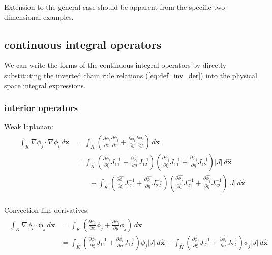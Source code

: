 \documentclass[10pt]{article}
\begin{document}
Extension to the general case should be apparent from the specific two-dimensional examples.

\subsection{continuous integral operators} \label{ssec:integral_operators}

We can write the forms of the continuous integral operators by directly substituting the inverted
chain rule relations (\ref{eq:def_inv_der}) into the physical space integral expressions.

  \subsubsection{interior operators}

  Weak laplacian:
  \begin{align}
    \begin{split}
    \int_{K}^{} \nabla\phi_j\cdot\nabla\phi_i \,d\bm{x}
    &= \int_{K}^{} \left( \frac{\partial \phi_i}{\partial x} \frac{\partial \phi_j}{\partial x}
    + \frac{\partial \phi_i}{\partial y} \frac{\partial \phi_j}{\partial y}\right)\,d\bm{x} \\
    &=
    \int_{\widehat{K}} 
    \left( \frac{\partial \widehat{\phi_i}}{\partial \xi} J^{-1}_{11} 
    + \frac{\partial \widehat{\phi_i}}{\partial \eta} J^{-1}_{12} \right) 
    \left( \frac{\partial \widehat{\phi_j}}{\partial \xi} J^{-1}_{11} 
    + \frac{\partial \widehat{\phi_j}}{\partial \eta} J^{-1}_{12} \right) 
    |J|\,d\bm{\widehat{x}} \\
    &\qquad + 
    \int_{\widehat{K}} 
    \left( \frac{\partial \widehat{\phi_i}}{\partial \xi} J^{-1}_{21} 
    + \frac{\partial \widehat{\phi_i}}{\partial \eta} J^{-1}_{22} \right) 
    \left( \frac{\partial \widehat{\phi_j}}{\partial \xi} J^{-1}_{21} 
    + \frac{\partial \widehat{\phi_j}}{\partial \eta} J^{-1}_{22} \right) 
    |J|\,d\bm{\widehat{x}} \\
    \end{split}
    \label{eq:cts_weak_laplacian}
  \end{align}

  Convection-like derivatives:
  \begin{align}
    \begin{split}
      \int_{K}^{} \nabla\phi_i\cdot \bm{\phi}_j \,d\bm{x}
    &= \int_{K}^{} \left( \frac{\partial \phi_i}{\partial x} \phi_j
    + \frac{\partial \phi_i}{\partial y} \phi_j \right)\,d\bm{x} \\
    &= \int_{\widehat{K}} 
    \left( \frac{\partial \widehat{\phi_i}}{\partial \xi} J^{-1}_{11} 
    + \frac{\partial \widehat{\phi_i}}{\partial \eta} J^{-1}_{12} \right) \phi_j
    |J|\,d\bm{\widehat{x}} 
    + \int_{\widehat{K}} 
    \left( \frac{\partial \widehat{\phi_i}}{\partial \xi} J^{-1}_{21} 
    + \frac{\partial \widehat{\phi_i}}{\partial \eta} J^{-1}_{22} \right) \phi_j
    |J|\,d\bm{\widehat{x}} \\
    \end{split}
    \label{eq:cts_weak_convection}
  \end{align}
\end{document}
